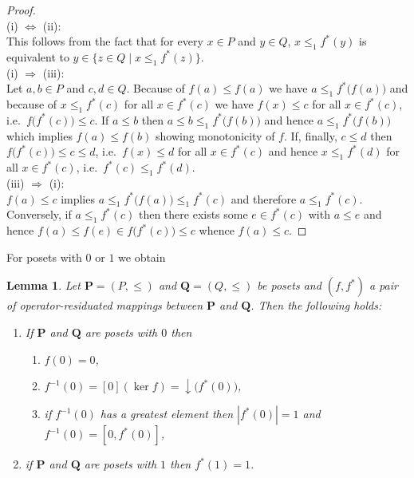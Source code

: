 \documentclass[12pt]{article}
\newtheorem{lemma}[theorem]{Lemma}
\begin{document}
\begin{proof}
$\text{}$ \\
(i) $\Leftrightarrow$ (ii): \\
This follows from the fact that for every $x\in P$ and $y\in Q$, $x\le_1f^*(y)$ is equivalent to $y\in\{z\in Q\mid x\le_1f^*(z)\}$. \\
(i) $\Rightarrow$ (iii): \\
Let $a,b\in P$ and $c,d\in Q$. Because of $f(a)\le f(a)$ we have $a\le_1f^*\big(f(a)\big)$ and because of $x\le_1f^*(c)$ for all $x\in f^*(c)$ we have $f(x)\le c$ for all $x\in f^*(c)$, i.e.\ $f\big(f^*(c)\big)\le c$. If $a\le b$ then $a\le b\le_1f^*\big(f(b)\big)$ and hence $a\le_1f^*\big(f(b)\big)$ which implies $f(a)\le f(b)$ showing monotonicity of $f$. If, finally, $c\le d$ then $f\big(f^*(c)\big)\le c\le d$, i.e.\ $f(x)\le d$ for all $x\in f^*(c)$ and hence $x\le_1f^*(d)$ for all $x\in f^*(c)$, i.e.\ $f^*(c)\le_1f^*(d)$. \\
(iii) $\Rightarrow$ (i): \\
$f(a)\le c$ implies $a\le_1f^*\big(f(a)\big)\le_1f^*(c)$ and therefore $a\le_1f^*(c)$. Conversely, if $a\le_1f^*(c)$ then there exists some $e\in f^*(c)$ with $a\le e$ and hence $f(a)\le f(e)\in f\big(f^*(c)\big)\le c$ whence $f(a)\le c$.
\end{proof}

For posets with $0$ or $1$ we obtain

\begin{lemma}\label{lem4}
Let $\mathbf P=(P,\le)$ and $\mathbf Q=(Q,\le)$ be posets and $(f,f^*)$ a pair of operator-residuated mappings between $\mathbf P$ and $\mathbf Q$. Then the following holds:
\begin{enumerate}[{\rm(i)}]
\item If $\mathbf P$ and $\mathbf Q$ are posets with $0$ then
\begin{enumerate}[{\rm(a)}]
\item $f(0)=0$,
\item $f^{-1}(0)=[0](\ker f)=\downarrow\big(f^*(0)\big)$,
\item if $f^{-1}(0)$ has a greatest element then $|f^*(0)|=1$ and $f^{-1}(0)=[0,f^*(0)]$,
\end{enumerate}
\item if $\mathbf P$ and $\mathbf Q$ are posets with $1$ then $f^*(1)=1$.
\end{enumerate}
\end{lemma}
\end{document}
